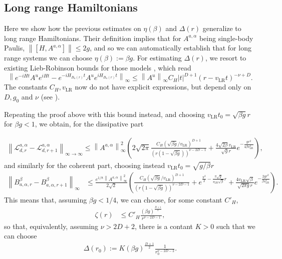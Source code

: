 \documentclass[aps,pra,amsmath,amssymb,twocolumn,10pt]{revtex4-2}
\theoremstyle{definition}
\newcommand{\norm}[1]{\left\|#1\right\|}
\begin{document}
\subsection{Long range Hamiltonians}\label{app:longrange}

Here we show how the previous estimates on $\eta(\beta)$ and $\Delta(r)$ generalize to long range Hamiltonians. Their definition implies that for $A^{a,\alpha}$ being single-body Paulis, $\norm{[H,A^{a,\alpha}]} \le 2 g$, and so we can automatically establish that for long range systems we can choose $   \eta(\beta):=  \beta g$. For estimating $\Delta(r)$, we resort to existing Lieb-Robinson bounds for those models \cite{Kuwahara2019LongRange}, which read
\begin{equation}\label{eq:LiebRobinson}
	\norm{e^{-iHt}A^u e^{iHt}-e^{-iH_{B_u(r)}t}A^u e^{iH_{B_u(r)}t}}_\infty \le \norm{A^u}_\infty C_H  \vert t \vert^{D+1} \left (r - v_{\text{LR}} t \right)^{-\nu+D}.
\end{equation}
The constants $C_H,v_{\text{LR}}$ now do not have explicit expressions, but depend only on $D, g_0$ and $\nu$ (see \cite{Kuwahara2019LongRange}). 

Repeating the proof above with this bound instead, and choosing $v_{\text{LR}} t_0=\sqrt{\beta g} r $ for $\beta g <1$, we obtain, for the dissipative part

\begin{align}
	\norm{  \mathcal{L}^{a,\alpha}_{d,r}-\mathcal{L}^{a,\alpha}_{d,r+1} }_{\infty\to\infty} \le  \norm{A^{a,\alpha}}_\infty^2  \left(2 \sqrt{2 \pi} \frac{C_H (\sqrt{\beta g}/ v_{\text{LR}})^{D+1}}{(r(1-\sqrt{\beta g}))^{\nu-2D-1}} +  \frac{4 \sqrt{2 \beta}  v_{\text{LR}}}{ \sqrt{ g} r} e^{-\frac{g r^2}{4\beta  v_{\text{LR}}^2}} \right),
\end{align}
and similarly for the coherent part, choosing instead $v_{\text{LR}} t_0=\sqrt{ g/\beta } r $
\begin{align}
	\norm{  B^\beta_{a,\alpha,r}- B^\beta_{a,\alpha,r+1} }_\infty & \le \frac{e^{1/8} \norm{A^{a,\alpha}}_\infty^2}{2 \sqrt{2}} \left ( \frac{C_H (\sqrt{\beta g}/ v_{\text{LR}})^{D+1}}{(r(1-\sqrt{\beta g}))^{\nu-2D-1}} + e^{\frac{\pi^2}{2}- \frac{\pi\sqrt{g}}{ v_{\text{LR}}\sqrt{\beta}} r  }+\frac{4 v_{\text{LR}} \sqrt{\beta}  }{\sqrt{2 \pi g}  r} e^{- \frac{2 g r^2}{\beta v_{\text{LR}}^2 }}  \right).
\end{align}
This means that, assuming $\beta g <1/4$, we can choose, for some constant $C'_H$,
\begin{align}
	\zeta(r)&\le C'_H \frac{(\beta g)^{\frac{D+1}{2}}}{r^{\nu-2D-1}},
\end{align}
so that, equivalently, assuming $\nu>2D+2$, there is a contant $K>0$ such that we can choose
\begin{align}
	\Delta(r_0) := K  (\beta g)^{\frac{D+1}{2}} \frac{1}{r_0^{\nu -2D-2 }}.
\end{align}
\end{document}
